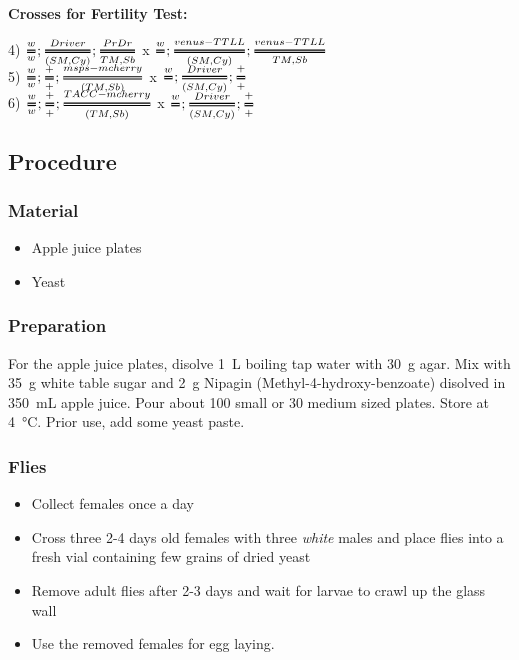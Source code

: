 \documentclass{article}
\newcommand{\Tfrac}[2]{%
	\ooalign{%
		$\genfrac{}{}{2.5pt}1{#1}{#2}$\cr%
		$\color{white}\genfrac{}{}{.8pt}1{\phantom{#1}}{\phantom{#2}}$}%
}
\begin{document}
\textbf{Crosses for Fertility Test:} \\

\begin{Large}
	4) $\Tfrac{w}{w}; \Tfrac{Driver}{(SM, Cy)}; \Tfrac{Pr Dr}{TM, Sb}$  x  $\Tfrac{w}{}; \Tfrac{venus-TTLL}{(SM, Cy)}; \Tfrac{venus-TTLL}{TM, Sb}$\\
	
	5) $\Tfrac{w}{w}; \Tfrac{+}{+}; \Tfrac{msps-mcherry}{(TM, Sb)}$  x  $\Tfrac{w}{}; \Tfrac{Driver}{(SM, Cy)}; \Tfrac{+}{+}$\\
	
	6) $\Tfrac{w}{w}; \Tfrac{+}{+}; \Tfrac{TACC-mcherry}{(TM, Sb)} $ x $\Tfrac{w}{}; \Tfrac{Driver}{(SM, Cy)}; \Tfrac{+}{+}$ 
\end{Large}


\subsection*{Procedure}
\subsubsection*{Material}
\begin{itemize}
	\item Apple juice plates
	\item Yeast
\end{itemize}

\subsubsection*{Preparation}
For the apple juice plates, disolve \SI{1}{\liter} boiling tap water with \SI{30}{\gram} agar. Mix with \SI{35}{\gram} white table sugar and \SI{2}{\gram} Nipagin (Methyl-4-hydroxy-benzoate) disolved in \SI{350}{\milli\liter} apple juice. Pour about 100 small or 30 medium sized plates. Store at \SI{4}{\degreeCelsius}. Prior use, add some yeast paste.

\subsubsection*{Flies}
\begin{itemize}
	\item Collect females once a day
	\item Cross three 2-4 days old females with three \textit{white} males and place flies into a fresh vial containing few grains of dried yeast
	\item Remove adult flies after 2-3 days and wait for larvae to crawl up the glass wall
	\item Use the removed females for egg laying. 
\end{itemize}
\end{document}
